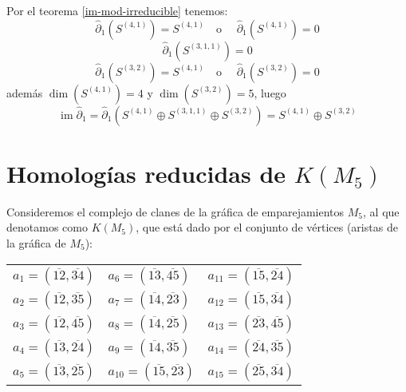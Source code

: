 \documentclass[12pt]{book}
\theoremstyle{definition}
\DeclareMathOperator{\im}{im}
\newcounter{in}
\begin{document}
Por el teorema \ref{im-mod-irreducible} tenemos:
  $$\widehat\partial_{1}(S^{(4,1)})=S^{(4,1)} \quad \mbox{o }\quad \widehat\partial_{1}(S^{(4,1)})=0$$
  $$\widehat\partial_{1}(S^{(3,1,1)})=0$$
  $$\widehat\partial_{1}(S^{(3,2)})=S^{(4,1)} \quad \mbox{o }\quad \widehat\partial_{1}(S^{(3,2)})=0$$
además $\dim(S^{(4,1)})=4$ y $\dim(S^{(3,2)})=5$, luego
$$\im\widehat\partial_{1}=\widehat\partial_{1}(S^{(4,1)}\oplus S^{(3,1,1)}\oplus S^{(3,2)})=S^{(4,1)}\oplus S^{(3,2)}$$

\section{Homologías reducidas de $K(M_{5})$}
\label{hom-red-KM5}

Consideremos el complejo de clanes de la gráfica de emparejamientos
$M_{5}$, al que denotamos como $K(M_{5})$, que está dado por el
conjunto de vértices (aristas de la gráfica de
$M_{5}$):
\begin{center}
  \begin{tabular}[h]{lll}
    $a_{1}=(\overline{12},\overline{34})$ & $a_{6}=(\overline{13},\overline{45})$ & $a_{11}=(\overline{15},\overline{24})$  \\
    $a_{2}=(\overline{12},\overline{35})$ & $a_{7}=(\overline{14},\overline{23})$ & $a_{12}=(\overline{15},\overline{34})$  \\
    $a_{3}=(\overline{12},\overline{45})$ & $a_{8}=(\overline{14},\overline{25})$ & $a_{13}=(\overline{23},\overline{45})$  \\
    $a_{4}=(\overline{13},\overline{24})$ & $a_{9}=(\overline{14},\overline{35})$ & $a_{14}=(\overline{24},\overline{35})$  \\
    $a_{5}=(\overline{13},\overline{25})$ & $a_{10}=(\overline{15},\overline{23})$ & $a_{15}=(\overline{25},\overline{34})$  
  \end{tabular}
\end{center}
\end{document}
